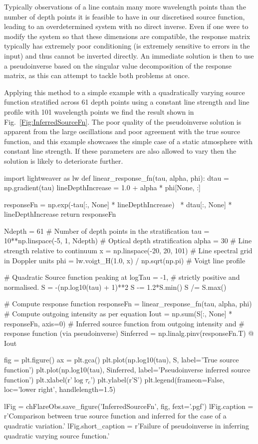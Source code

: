 Typically observations of a line contain many more wavelength points than the number of depth points it is feasible to have in our discretised source function, leading to an overdetermined system with no direct inverse.
Even if one were to modify the system so that these dimensions are compatible, the response matrix typically has extremely poor conditioning (is extremely sensitive to errors in the input) and thus cannot be inverted directly.
An immediate solution is then to use a pseudoinverse based on the singular value decomposition of the response matrix, as this can attempt to tackle both problems at once.

Applying this method to a simple example with a quadratically varying source function stratified across 61 depth points using a constant line strength and line profile with 101 wavelength points we find the result shown in Fig.~\ref{Fig:InferredSourceFn}.
The poor quality of the pseudoinverse solution is apparent from the large oscillations and poor agreement with the true source function, and this example showcases the simple case of a static atmosphere with constant line strength.
If these parameters are also allowed to vary then the solution is likely to deteriorate further.

\begin{pycode}[FlareObs]
import lightweaver as lw
def linear_response_fn(tau, alpha, phi):
    dtau = np.gradient(tau)
    lineDepthIncrease = 1.0 + alpha * phi[None, :]

    responseFn = np.exp(-tau[:, None] * lineDepthIncrease) \
                  * dtau[:, None] * lineDepthIncrease
    return responseFn

Ndepth = 61 # Number of depth points in the stratification
tau = 10**np.linspace(-5, 1, Ndepth) # Optical depth stratification
alpha = 30 # Line strength relative to continuum
x = np.linspace(-20, 20, 101) # Line spectral grid in Doppler units
phi = lw.voigt_H(1.0, x) / np.sqrt(np.pi) # Voigt line profile

# Quadratic Source function peaking at logTau = -1,
# strictly positive and normalised.
S = -(np.log10(tau) + 1)**2
S -= 1.2*S.min()
S /= S.max()

# Compute response function
responseFn = linear_response_fn(tau, alpha, phi)
# Compute outgoing intensity as per equation
Iout = np.sum(S[:, None] * responseFn, axis=0)
# Inferred source function from outgoing intensity and
# response function (via pseudoinverse)
Sinferred = np.linalg.pinv(responseFn.T) @ Iout

fig = plt.figure()
ax = plt.gca()
plt.plot(np.log10(tau), S, label='True source function')
plt.plot(np.log10(tau), Sinferred, label='Pseudoinverse inferred source function')
plt.xlabel(r'$\log\tau_c$')
plt.ylabel(r'S')
plt.legend(frameon=False, loc='lower right', handlelength=1.5)

lFig = chFlareObs.save_figure('InferredSourceFn', fig, fext='.pgf')
lFig.caption = r'Comparison between true source function and inferred for the case of a quadratic variation.'
lFig.short_caption = r'Failure of pseudoinverse in inferring quadratic varying source function.'
\end{pycode}

